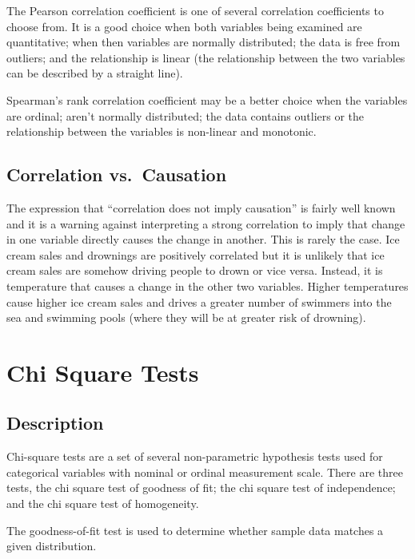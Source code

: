 \documentclass[
]{book}
\begin{document}
The Pearson correlation coefficient is one of several correlation coefficients to choose from. It is a good choice when both variables being examined are quantitative; when then variables are normally distributed; the data is free from outliers; and the relationship is linear (the relationship between the two variables can be described by a straight line).

Spearman's rank correlation coefficient may be a better choice when the variables are ordinal; aren't normally distributed; the data contains outliers or the relationship between the variables is non-linear and monotonic.

\hypertarget{correlation-vs.-causation}{%
\section{Correlation vs.~Causation}\label{correlation-vs.-causation}}

The expression that ``correlation does not imply causation'' is fairly well known and it is a warning against interpreting a strong correlation to imply that change in one variable directly causes the change in another. This is rarely the case. Ice cream sales and drownings are positively correlated but it is unlikely that ice cream sales are somehow driving people to drown or vice versa. Instead, it is temperature that causes a change in the other two variables. Higher temperatures cause higher ice cream sales and drives a greater number of swimmers into the sea and swimming pools (where they will be at greater risk of drowning).

\hypertarget{chisq}{%
\chapter{Chi Square Tests}\label{chisq}}

\hypertarget{description}{%
\section{Description}\label{description}}

Chi-square tests are a set of several non-parametric hypothesis tests used for categorical variables with nominal or ordinal measurement scale. There are three tests, the chi square test of goodness of fit; the chi square test of independence; and the chi square test of homogeneity.

The goodness-of-fit test is used to determine whether sample data matches a given distribution.
\end{document}
